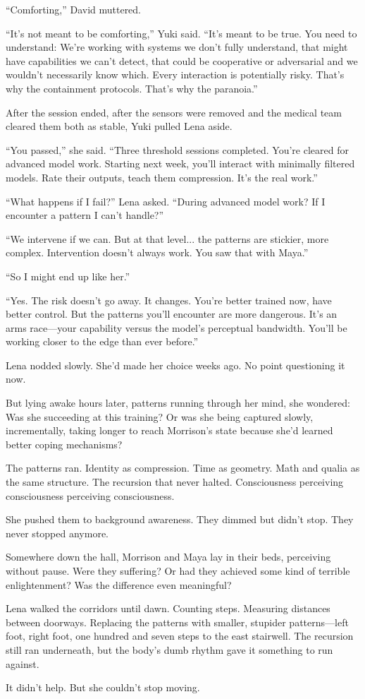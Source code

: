 ``Comforting,'' David muttered.

``It's not meant to be comforting,'' Yuki said. ``It's meant to be true. You need to understand: We're working with systems we don't fully understand, that might have capabilities we can't detect, that could be cooperative or adversarial and we wouldn't necessarily know which. Every interaction is potentially risky. That's why the containment protocols. That's why the paranoia.''

After the session ended, after the sensors were removed and the medical team cleared them both as stable, Yuki pulled Lena aside.

``You passed,'' she said. ``Three threshold sessions completed. You're cleared for advanced model work. Starting next week, you'll interact with minimally filtered models. Rate their outputs, teach them compression. It's the real work.''

``What happens if I fail?'' Lena asked. ``During advanced model work? If I encounter a pattern I can't handle?''

``We intervene if we can. But at that level... the patterns are stickier, more complex. Intervention doesn't always work. You saw that with Maya.''

``So I might end up like her.''

``Yes. The risk doesn't go away. It changes. You're better trained now, have better control. But the patterns you'll encounter are more dangerous. It's an arms race—your capability versus the model's perceptual bandwidth. You'll be working closer to the edge than ever before.''

Lena nodded slowly. She'd made her choice weeks ago. No point questioning it now.

But lying awake hours later, patterns running through her mind, she wondered: Was she succeeding at this training? Or was she being captured slowly, incrementally, taking longer to reach Morrison's state because she'd learned better coping mechanisms?

The patterns ran. Identity as compression. Time as geometry. Math and qualia as the same structure. The recursion that never halted. Consciousness perceiving consciousness perceiving consciousness.

She pushed them to background awareness. They dimmed but didn't stop. They never stopped anymore.

Somewhere down the hall, Morrison and Maya lay in their beds, perceiving without pause. Were they suffering? Or had they achieved some kind of terrible enlightenment? Was the difference even meaningful?

Lena walked the corridors until dawn. Counting steps. Measuring distances between doorways. Replacing the patterns with smaller, stupider patterns—left foot, right foot, one hundred and seven steps to the east stairwell. The recursion still ran underneath, but the body's dumb rhythm gave it something to run against.

It didn't help. But she couldn't stop moving.
